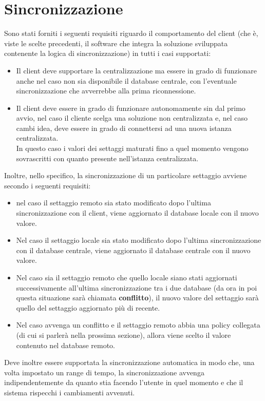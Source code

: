 \documentclass[\main/tesi.tex]{subfiles}
\begin{document}
\section{Sincronizzazione}
Sono stati forniti i seguenti requisiti riguardo il comportamento del client (che è, viste le scelte precedenti, il software che integra la soluzione sviluppata contenente la logica di sincronizzazione) in tutti i casi supportati:
\begin{itemize}
    \item Il client deve supportare la centralizzazione ma essere in grado di funzionare anche nel caso non sia disponibile il database centrale, con l'eventuale sincronizzazione che avverrebbe alla prima riconnessione.
    \item Il client deve essere in grado di funzionare autonomamente sin dal primo avvio, nel caso il cliente scelga una soluzione non centralizzata e, nel caso cambi idea, deve essere in grado di connettersi ad una nuova istanza centralizzata.\\In questo caso i valori dei settaggi maturati fino a quel momento vengono sovrascritti con quanto presente nell'istanza centralizzata.
\end{itemize}
Inoltre, nello specifico, la sincronizzazione di un particolare settaggio avviene secondo i seguenti requisiti:
\begin{itemize}
    \item nel caso il settaggio remoto sia stato modificato dopo l'ultima sincronizzazione con il client, viene aggiornato il database locale con il nuovo valore.
    \item Nel caso il settaggio locale sia stato modificato dopo l'ultima sincronizzazione con il database centrale, viene aggiornato il database centrale con il nuovo valore. 
    \item Nel caso sia il settaggio remoto che quello locale siano stati aggiornati successivamente all'ultima sincronizzazione tra i due database (da ora in poi questa situazione sarà chiamata \textbf{conflitto}), il nuovo valore del settaggio sarà quello del settaggio aggiornato più di recente.
    \item Nel caso avvenga un conflitto e il settaggio remoto abbia una policy collegata (di cui si parlerà nella prossima sezione), allora viene scelto il valore contenuto nel database remoto.
\end{itemize}
Deve inoltre essere supportata la sincronizzazione automatica in modo che, una volta impostato un range di tempo, la sincronizzazione avvenga indipendentemente da quanto stia facendo l'utente in quel momento e che il sistema rispecchi i cambiamenti avvenuti.
\end{document}
